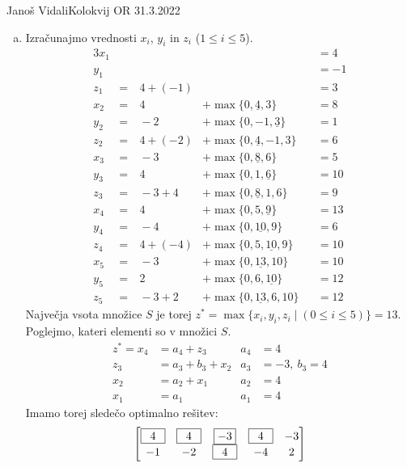\begin{naloga}{Janoš Vidali}{Kolokvij OR 31.3.2022}
\begin{odgovor}
\begin{enumerate}[(a)]
\item Izračunajmo vrednosti $x_i$, $y_i$ in $z_i$ ($1 \le i \le 5$).
\begin{alignat*}{3}
x_1 &&&&&= 4 \\
y_1 &&&&&= -1 \\
z_1 &=&\ 4 + (-1) &&&= 3 \\
x_2 &=&\ 4 &+ \max\{0, \underline{4}, 3\} &&= 8 \\
y_2 &=&\ -2 &+ \max\{0, -1, \underline{3}\} &&= 1 \\
z_2 &=&\ 4 + (-2) &+ \max\{0, \underline{4}, -1, 3\} &&= 6 \\
x_3 &=&\ -3 &+ \max\{0, \underline{8}, 6\} &&= 5 \\
y_3 &=&\ 4 &+ \max\{0, 1, \underline{6}\} &&= 10 \\
z_3 &=&\ -3 + 4 &+ \max\{0, \underline{8}, 1, 6\} &&= 9 \\
x_4 &=&\ 4 &+ \max\{0, 5, \underline{9}\} &&= 13 \\
y_4 &=&\ -4 &+ \max\{0, \underline{10}, 9\} &&= 6 \\
z_4 &=&\ 4 + (-4) &+ \max\{0, 5, \underline{10}, 9\} &&= 10 \\
x_5 &=&\ -3 &+ \max\{0, \underline{13}, 10\} &&= 10 \\
y_5 &=&\ 2 &+ \max\{0, 6, \underline{10}\} &&= 12 \\
z_5 &=&\ -3 + 2 &+ \max\{0, \underline{13}, 6, 10\} &&= 12
\end{alignat*}
Največja vsota množice $S$ je torej
$z^* = \max\{x_i, y_i, z_i \mid (0 \le i \le 5)\} = 13$.
Poglejmo, kateri elementi so v množici $S$.
\begin{align*}
z^* = x_4 &= a_4 + z_3       & a_4 &= 4 \\
      z_3 &= a_3 + b_3 + x_2 & a_3 &= -3,\ b_3 = 4 \\
      x_2 &= a_2 + x_1       & a_2 &= 4 \\
      x_1 &= a_1             & a_1 &= 4
\end{align*}
Imamo torej sledečo optimalno rešitev:
$$
\begin{bmatrix}
\fbox{$\,\ 4\ \,$} & \fbox{$\,\ 4\ \,$} & \fbox{$-3$} & \fbox{$\,\ 4\ \,$} & -3 \\
-1 & -2 & \fbox{$\,\ 4\ \,$} & -4 & 2
\end{bmatrix}
$$
\end{enumerate}
\end{odgovor}
\end{naloga}
